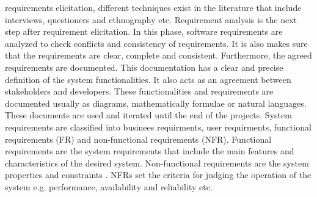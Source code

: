 requirements elicitation, different techniques exist in the literature that
include interviews, questioners and ethnography etc.
Requirement analysis \cite{Nuseibeh:2000:RER:336512.336523} is the next step
after requirement elicitation. In this phase, software requirements are analyzed
to check conflicts and consistency of requirements. It is also makes sure that
the requirements are clear, complete and consistent. Furthermore, the agreed
requirements are documented. This documentation has a clear and precise
definition of the system functionalities. It also acts as an agreement between
stakeholders and developers. These functionalities and requirements are
documented usually as diagrams, mathematically formulae or natural languages.
These documents are used and iterated until the end of the projects.
System requirements are classified into businees requirments, user requirments,
functional requirements (FR) and non-functional requirements (NFR). Functional
requirements are the system requirements that include the main features and
characteristics of the desired system. Non-functional requirements are the
system properties and constraints \cite{Davis:1993:SRO:113586}. NFRs set the
criteria for judging the operation of the system e.g.
performance, availability and reliability etc.
